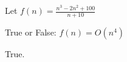 \begin{prob}

    Let $f(n) = \displaystyle\frac{n^3 - 2n^2 + 100}{n + 10}$

    True or False: $f(n) = O(n^4)$

    \Tf{}

    \begin{soln}
        True.
    \end{soln}


\end{prob}

